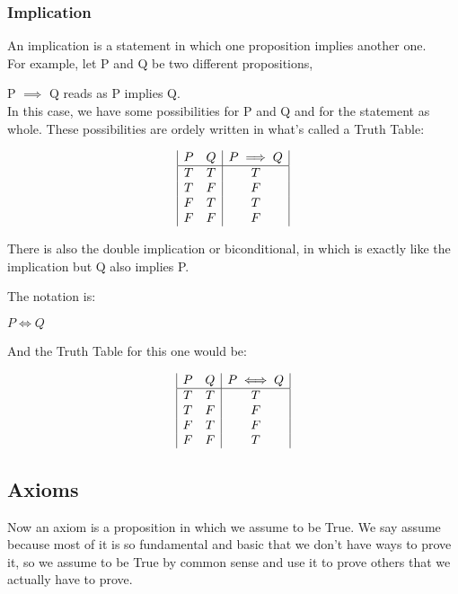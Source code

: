 \documentclass{article}
\begin{document}
\subsubsection{Implication}
An implication is a statement
in which one proposition implies another one.\\

For example, let P and Q be two different propositions,

P $\implies$ Q reads as P implies Q.\\

In this case, we have some possibilities for P and Q and for the
statement as whole.
These possibilities are ordely written in what's called a Truth Table:

\begin{displaymath}
    \begin{array}{|c c|c|}
        P & Q & P \implies Q\\
        \hline
        T & T & T\\
        T & F & F\\
        F & T & T\\
        F & F & F\\
    \end{array}
\end{displaymath}

\newpage
\indent
There is also the double implication
or biconditional, in which is exactly 
like the implication but Q also implies P.

The notation is:

$P \iff Q$

And the Truth Table for this one would be:

\begin{displaymath}
    \begin{array}{|c c|c|}
        P & Q & P \iff Q\\
        \hline
        T & T & T\\
        T & F & F\\
        F & T & F\\
        F & F & T\\
    \end{array}
\end{displaymath}

\subsection{Axioms}


Now an axiom is a proposition in which
we assume to be True. We say assume because most of it
is so fundamental and basic that we don't have
ways to prove it, so we assume to be True
by common sense and use it 
to prove others that we actually have to prove.\\
\end{document}
